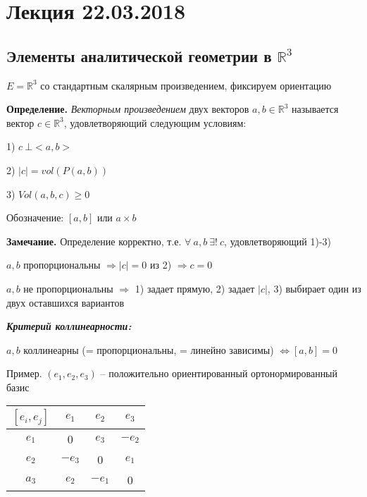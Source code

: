 \section{Лекция 22.03.2018}

\subsection{Элементы аналитической геометрии в $\mathbb{R}^3$}

$E =\mathbb{R}^3$ со стандартным скалярным произведением, фиксируем ориентацию 

\vspace{\baselineskip}
\textbf{Определение.} \textit{Векторным произведением} двух векторов $a, b \in \mathbb{R}^3$ называется вектор $c \in \mathbb{R}^3$, удовлетворяющий следующим условиям:

1) $c \ \bot <a, b>$

2) $|c| = vol (P(a, b))$

3) $Vol(a, b, c) \geq 0$

Обозначение: $[a, b]$ или $a \times b$

\vspace{\baselineskip}
\textbf{Замечание.} Определение корректно, т.е. $\forall \ a, b \ \exists! \ c$,  удовлетворяющий 1)-3)

$a, b$ пропорциональны $\Rightarrow |c| = 0$ из 2) $\Rightarrow c = 0$

$a, b$ не пропорциональны $\Rightarrow$ 1) задает прямую, 2) задает $|c|$, 3) выбирает один из двух оставшихся вариантов

\vspace{\baselineskip}
\textbf{\textit{Критерий коллинеарности:}}

$a, b$ коллинеарны (= пропорциональны, = линейно зависимы) $\Leftrightarrow [a, b] = 0$

\vspace{\baselineskip}
Пример. $(e_1, e_2, e_3)$ -- положительно ориентированный ортонормированный базис

\vspace{\baselineskip}
\begin{tabular}{c|c|c|c}
$[e_i, e_j]$ & $e_1$ & $e_2$ & $e_3$ \\
\hline
$e_1$ & 0 & $e_3$ & $-e_2$  \\
\hline
$e_2$ & $-e_3$ & 0 & $e_1$   \\
\hline
$a_3$ & $e_2$ & $-e_1$ & 0   \\
\hline
\end{tabular}

